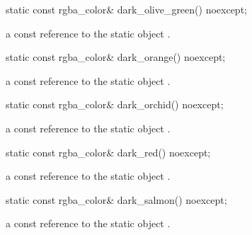 \begin{itemdecl}
    static const rgba_color& dark_olive_green() noexcept;
\end{itemdecl}
\begin{itemdescr}
    \pnum
    \returns
    a const reference to the static  object .
\end{itemdescr}

\begin{itemdecl}
    static const rgba_color& dark_orange() noexcept;
\end{itemdecl}
\begin{itemdescr}
    \pnum
    \returns
    a const reference to the static  object .
\end{itemdescr}

\begin{itemdecl}
    static const rgba_color& dark_orchid() noexcept;
\end{itemdecl}
\begin{itemdescr}
    \pnum
    \returns
    a const reference to the static  object .
\end{itemdescr}

\begin{itemdecl}
    static const rgba_color& dark_red() noexcept;
\end{itemdecl}
\begin{itemdescr}
    \pnum
    \returns
    a const reference to the static  object .
\end{itemdescr}

\begin{itemdecl}
    static const rgba_color& dark_salmon() noexcept;
\end{itemdecl}
\begin{itemdescr}
    \pnum
    \returns
    a const reference to the static  object .
\end{itemdescr}


